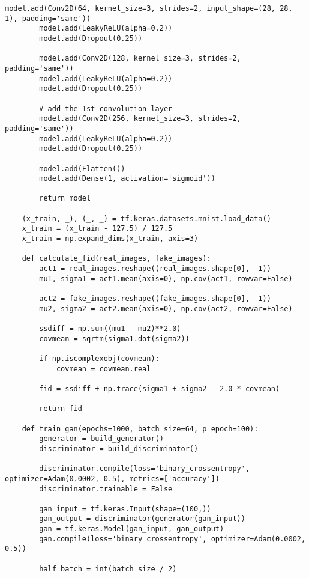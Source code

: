 \begin{lstlisting}[style=mypython, caption=Explore GAN with more convolutional layers 4]
        model.add(Conv2D(64, kernel_size=3, strides=2, input_shape=(28, 28, 1), padding='same'))
        model.add(LeakyReLU(alpha=0.2))
        model.add(Dropout(0.25))
    
        model.add(Conv2D(128, kernel_size=3, strides=2, padding='same'))
        model.add(LeakyReLU(alpha=0.2))
        model.add(Dropout(0.25))
    
        # add the 1st convolution layer
        model.add(Conv2D(256, kernel_size=3, strides=2, padding='same'))
        model.add(LeakyReLU(alpha=0.2))
        model.add(Dropout(0.25))
    
        model.add(Flatten())
        model.add(Dense(1, activation='sigmoid'))
    
        return model
    
    (x_train, _), (_, _) = tf.keras.datasets.mnist.load_data()
    x_train = (x_train - 127.5) / 127.5
    x_train = np.expand_dims(x_train, axis=3)
    
    def calculate_fid(real_images, fake_images):
        act1 = real_images.reshape((real_images.shape[0], -1))
        mu1, sigma1 = act1.mean(axis=0), np.cov(act1, rowvar=False)
        
        act2 = fake_images.reshape((fake_images.shape[0], -1))
        mu2, sigma2 = act2.mean(axis=0), np.cov(act2, rowvar=False)
        
        ssdiff = np.sum((mu1 - mu2)**2.0)
        covmean = sqrtm(sigma1.dot(sigma2))
        
        if np.iscomplexobj(covmean):
            covmean = covmean.real
        
        fid = ssdiff + np.trace(sigma1 + sigma2 - 2.0 * covmean)
        
        return fid
    
    def train_gan(epochs=1000, batch_size=64, p_epoch=100):
        generator = build_generator()
        discriminator = build_discriminator()
    
        discriminator.compile(loss='binary_crossentropy', optimizer=Adam(0.0002, 0.5), metrics=['accuracy'])
        discriminator.trainable = False
    
        gan_input = tf.keras.Input(shape=(100,))
        gan_output = discriminator(generator(gan_input))
        gan = tf.keras.Model(gan_input, gan_output)
        gan.compile(loss='binary_crossentropy', optimizer=Adam(0.0002, 0.5))
    
        half_batch = int(batch_size / 2)
        

\end{lstlisting}
